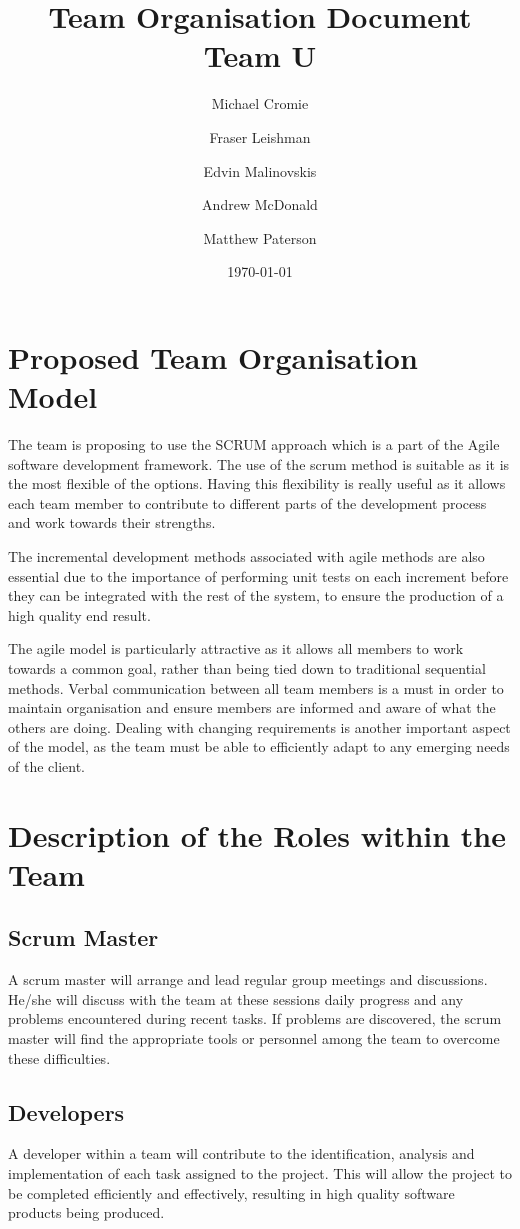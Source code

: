 \documentclass{article}
\title{Team Organisation Document\\Team U}
\author{
    Michael Cromie\\
    \and
    Fraser Leishman\\
    \and
    Edvin Malinovskis\\
    \and
    Andrew McDonald\\
    \and
    Matthew Paterson
}
\begin{document}
\date{\today}
\maketitle

\section{Proposed Team Organisation Model}
The team is proposing to use the SCRUM approach which is a part of the Agile
software development framework.   The use of the scrum method is suitable as it
is the most flexible of the options. Having this flexibility is really useful
as it allows each team member to contribute to different parts of the
development process and work towards their strengths.


The incremental development methods associated with agile methods are also
essential due to the importance of performing unit tests on each increment
before they can be integrated with the rest of the system, to ensure the
production of a high quality end result.


The agile model is particularly attractive as it allows all members to work
towards a common goal, rather than being tied down to traditional sequential
methods. Verbal communication between all team members is a must in order to
maintain organisation and ensure members are informed and aware of what the
others are doing. Dealing with changing requirements is another important
aspect of the model, as the team must be able to efficiently adapt to any
emerging needs of the client. 

\section{Description of the Roles within the Team}
\subsection{Scrum Master}
A scrum master will arrange and lead regular group meetings and discussions.
He/she will discuss with the team at these sessions daily progress and any
problems encountered during recent tasks. If problems are discovered, the scrum
master will find the appropriate tools or personnel among the team to overcome
these difficulties.
\subsection{Developers}
A developer within a team will contribute to the identification, analysis and
implementation of each task assigned to the project. This will allow the
project to be completed efficiently and effectively, resulting in high quality
software products being produced. 
\end{document}
